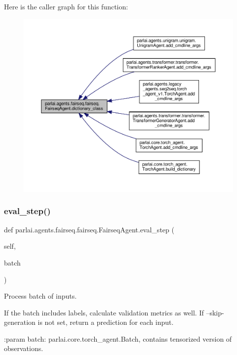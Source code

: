 Here is the caller graph for this function\+:
\nopagebreak
\begin{figure}[H]
\begin{center}
\leavevmode
\includegraphics[width=350pt]{classparlai_1_1agents_1_1fairseq_1_1fairseq_1_1FairseqAgent_a3dc59646a2e97d015dfdddb65021429b_icgraph}
\end{center}
\end{figure}
\mbox{\label{classparlai_1_1agents_1_1fairseq_1_1fairseq_1_1FairseqAgent_aa635ffc4c0a0649c66b9b1cbb4dd5367}} 
\subsubsection{\texorpdfstring{eval\+\_\+step()}{eval\_step()}}
{\footnotesize\ttfamily def parlai.\+agents.\+fairseq.\+fairseq.\+Fairseq\+Agent.\+eval\+\_\+step (\begin{DoxyParamCaption}\item[{}]{self,  }\item[{}]{batch }\end{DoxyParamCaption})}

\begin{DoxyVerb}Process batch of inputs.

If the batch includes labels, calculate validation metrics as well.
If --skip-generation is not set, return a prediction for each input.

:param batch: parlai.core.torch_agent.Batch, contains tensorized
      version of observations.
\end{DoxyVerb}
 

